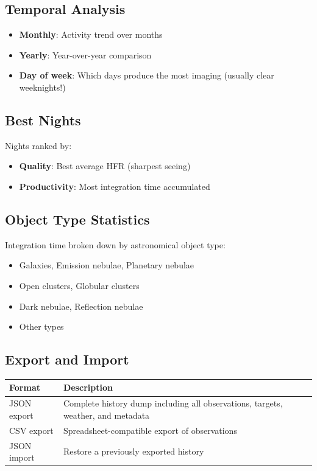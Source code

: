 \documentclass[11pt,a4paper]{article}
\begin{document}
\subsection{Temporal Analysis}

\begin{itemize}
    \item \textbf{Monthly}: Activity trend over months
    \item \textbf{Yearly}: Year-over-year comparison
    \item \textbf{Day of week}: Which days produce the most imaging (usually clear weeknights!)
\end{itemize}

\subsection{Best Nights}

Nights ranked by:
\begin{itemize}
    \item \textbf{Quality}: Best average HFR (sharpest seeing)
    \item \textbf{Productivity}: Most integration time accumulated
\end{itemize}

\subsection{Object Type Statistics}

Integration time broken down by astronomical object type:
\begin{itemize}
    \item Galaxies, Emission nebulae, Planetary nebulae
    \item Open clusters, Globular clusters
    \item Dark nebulae, Reflection nebulae
    \item Other types
\end{itemize}

\subsection{Export and Import}

\begin{center}
\begin{tabular}{lp{9cm}}
\toprule
\textbf{Format} & \textbf{Description} \\
\midrule
JSON export & Complete history dump including all observations, targets, weather, and metadata \\
CSV export & Spreadsheet-compatible export of observations \\
JSON import & Restore a previously exported history \\
\bottomrule
\end{tabular}
\end{center}
\end{document}
